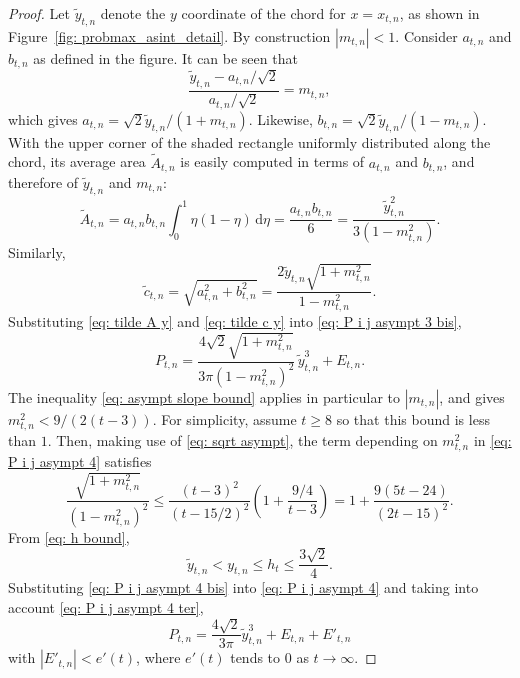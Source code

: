 \documentclass[12pt, a4paper]{article}
\newcommand{\diff}{\mathrm d}
\newcommand{\tiles}{t} %
\begin{document}
\begin{proof}
Let $\tilde y_{\tiles,n}$ denote the $y$ coordinate of the chord for $x = x_{\tiles,n}$, as shown in Figure~\ref{fig: probmax_asint_detail}. By construction $|m_{\tiles,n}|<1$. Consider $a_{\tiles,n}$ and $b_{\tiles,n}$ as defined in the figure. It can be seen that
\begin{equation}
\frac{\tilde y_{\tiles,n}-a_{\tiles,n}/\sqrt{2}}{a_{\tiles,n}/\sqrt{2}} = m_{\tiles,n},
\end{equation}
which gives $a_{\tiles,n} = \sqrt{2}\tilde y_{\tiles,n}/(1+m_{\tiles,n})$. Likewise, $b_{\tiles,n} = \sqrt{2}\tilde y_{\tiles,n}/(1-m_{\tiles,n})$. With the upper corner of the shaded rectangle uniformly distributed along the chord, its average area $\tilde A_{\tiles,n}$ is easily computed in terms of $a_{\tiles,n}$ and $b_{\tiles,n}$, and therefore of $\tilde y_{\tiles,n}$ and $m_{\tiles,n}$:
\begin{equation}
\label{eq: tilde A y}
\tilde A_{\tiles,n} = a_{\tiles,n}b_{\tiles,n} \int_0^1 \eta(1-\eta)\, \diff \eta = \frac{a_{\tiles,n}b_{\tiles,n}} 6 = \frac{\tilde y_{\tiles,n}^2}{3(1-m_{\tiles,n}^2)}.
\end{equation}
Similarly,
\begin{equation}
\label{eq: tilde c y}
\tilde c_{\tiles,n} = \sqrt{a_{\tiles,n}^2+b_{\tiles,n}^2} = \frac {2 \tilde y_{\tiles,n} \sqrt{1+m_{\tiles,n}^2}} {1-m_{\tiles,n}^2}.
\end{equation}
Substituting \eqref{eq: tilde A y} and \eqref{eq: tilde c y} into \eqref{eq: P i j asympt 3 bis},
\begin{equation}
\label{eq: P i j asympt 4}
P_{\tiles,n}
= \frac{4\sqrt{2} \sqrt{1+m_{\tiles,n}^2}} {3\pi(1-m_{\tiles,n}^2)^2}\, \tilde y_{\tiles,n}^3 + E_{\tiles, n}.
\end{equation}
The inequality \eqref{eq: asympt slope bound} applies in particular to $|m_{\tiles,n}|$, and gives $m_{\tiles,n}^2 < 9/(2(\tiles-3))$. For simplicity, assume $\tiles \geq 8$ so that this bound is less than $1$. Then, making use of \eqref{eq: sqrt asympt}, the term depending on $m_{\tiles,n}^2$ in \eqref{eq: P i j asympt 4} satisfies
\begin{equation}
\label{eq: P i j asympt 4 bis}
\frac{\sqrt{1+m_{\tiles, n}^2}} {(1-m_{\tiles, n}^2)^2} \leq \frac{(\tiles-3)^2}{(\tiles-15/2)^2} \left(1+\frac {9/4} {\tiles-3}\right) = 1 + \frac{9(5\tiles - 24)}{(2\tiles-15)^2}.
\end{equation}
From \eqref{eq: h bound},
\begin{equation}
\label{eq: P i j asympt 4 ter}
\tilde y_{\tiles,n} < y_{\tiles,n} \leq h_\tiles \leq \frac{3\sqrt{2}} 4.
\end{equation}
Substituting \eqref{eq: P i j asympt 4 bis} into \eqref{eq: P i j asympt 4} and taking into account \eqref{eq: P i j asympt 4 ter},
\begin{equation}
\label{eq: P i j asympt 5}
P_{\tiles,n} = \frac{4\sqrt{2}} {3\pi} \tilde y_{\tiles,n}^3 + E_{\tiles,n} + E'_{\tiles,n}
\end{equation}
with $|E'_{\tiles,n}| < e'(t)$, where $e'(t)$ tends to $0$ as $t \rightarrow \infty$.


\end{proof}
\end{document}
